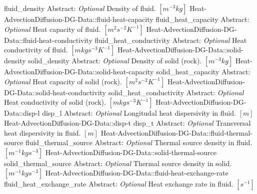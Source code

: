 \begin{RecordType}
			{fluid{\_}density}
			{{Abstract}{: }}
			{ \it{Optional} }
			{{{Density of fluid. }{$[m^{-3}kg]$}}}
		\RecKey
			{Heat-AdvectionDiffusion-DG-Data::fluid-heat-capacity}
			{fluid{\_}heat{\_}capacity}
			{{Abstract}{: }}
			{ \it{Optional} }
			{{{Heat capacity of fluid. }{$[m^{2}s^{-2}K^{-1}]$}}}
		\RecKey
			{Heat-AdvectionDiffusion-DG-Data::fluid-heat-conductivity}
			{fluid{\_}heat{\_}conductivity}
			{{Abstract}{: }}
			{ \it{Optional} }
			{{{Heat conductivity of fluid. }{$[mkgs^{-3}K^{-1}]$}}}
		\RecKey
			{Heat-AdvectionDiffusion-DG-Data::solid-density}
			{solid{\_}density}
			{{Abstract}{: }}
			{ \it{Optional} }
			{{{Density of solid (rock). }{$[m^{-3}kg]$}}}
		\RecKey
			{Heat-AdvectionDiffusion-DG-Data::solid-heat-capacity}
			{solid{\_}heat{\_}capacity}
			{{Abstract}{: }}
			{ \it{Optional} }
			{{{Heat capacity of solid (rock). }{$[m^{2}s^{-2}K^{-1}]$}}}
		\RecKey
			{Heat-AdvectionDiffusion-DG-Data::solid-heat-conductivity}
			{solid{\_}heat{\_}conductivity}
			{{Abstract}{: }}
			{ \it{Optional} }
			{{{Heat conductivity of solid (rock). }{$[mkgs^{-3}K^{-1}]$}}}
		\RecKey
			{Heat-AdvectionDiffusion-DG-Data::disp-l}
			{disp{\_}l}
			{{Abstract}{: }}
			{ \it{Optional} }
			{{{Longitudal heat dispersivity in fluid. }{$[m]$}}}
		\RecKey
			{Heat-AdvectionDiffusion-DG-Data::disp-t}
			{disp{\_}t}
			{{Abstract}{: }}
			{ \it{Optional} }
			{{{Transversal heat dispersivity in fluid. }{$[m]$}}}
		\RecKey
			{Heat-AdvectionDiffusion-DG-Data::fluid-thermal-source}
			{fluid{\_}thermal{\_}source}
			{{Abstract}{: }}
			{ \it{Optional} }
			{{{Thermal source density in fluid. }{$[m^{-1}kgs^{-3}]$}}}
		\RecKey
			{Heat-AdvectionDiffusion-DG-Data::solid-thermal-source}
			{solid{\_}thermal{\_}source}
			{{Abstract}{: }}
			{ \it{Optional} }
			{{{Thermal source density in solid. }{$[m^{-1}kgs^{-3}]$}}}
		\RecKey
			{Heat-AdvectionDiffusion-DG-Data::fluid-heat-exchange-rate}
			{fluid{\_}heat{\_}exchange{\_}rate}
			{{Abstract}{: }}
			{ \it{Optional} }
			{{{Heat exchange rate in fluid. }{$[s^{-1}]$}}}

\end{RecordType}
